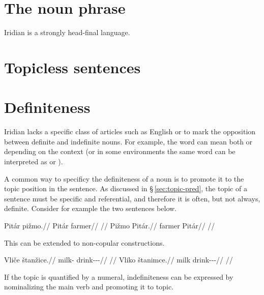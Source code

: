 \section{The noun phrase}

Iridian is a strongly head-final language.

\section{Topicless sentences}\label{sec:topicless}

\section{Definiteness}\label{sec:definiteness}

Iridian lacks a specific class of articles such as English
 or  to mark the opposition between definite and indefinite
nouns. For example, the word  can mean both  or  depending on the context (or in some environments the same word can be
interpreted as   or ).

A common way to specificy the definiteness of a noun is to promote it to the
topic position in the sentence. As discussed in \S\,\ref{sec:topic-pred}, the
topic of a sentence must be specific and referential, and therefore it is often,
but not always, definite. Consider for example the two sentences below.

\begin{multicols}{2}
  \pex
  \a
  \begingl
  \gla Pitár pižmo.//
  \glb Pitár farmer//
  \glft {}//
  \endgl
  \a
  \begingl
  \gla Pižmo Pitár.//
  \glb farmer Pitár//
  \glft {}//
  \endgl
  \xe
\end{multicols}

This can be extended to non-copular constructions.

\begin{multicols}{2}
  \pex
  \a
  \begingl
  \gla Vliče štanžice.//
  \glb milk-\Gen{} drink-\Av{}-\Pf{}-\Quot{}//
  \glft {}//
  \endgl
  \a
  \begingl
  \gla Vliko štanimce.//
  \glb milk drink-\Pv{}-\Pf{}-\Quot{}//
  \glft {}//
  \endgl
  \xe
\end{multicols}

If the topic is quantified by a numeral, indefiniteness can be expressed by nominalizing the main verb and promoting it to topic.


